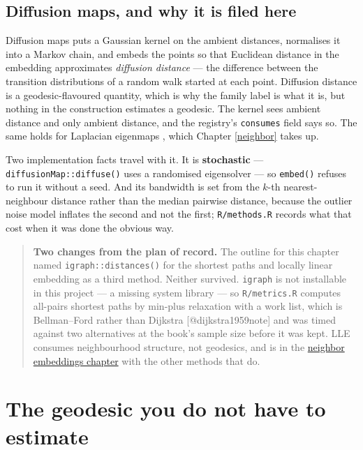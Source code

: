 \documentclass[
  british,
  a4paper,
]{book}
\newenvironment{boxreport}{\begin{quote}}{\end{quote}}
\begin{document}
\subsection{Diffusion maps, and why it is filed here}\label{diffusion-maps-and-why-it-is-filed-here}

Diffusion maps \citep{coifman2006diffusion} puts a Gaussian kernel on the ambient
distances, normalises it into a Markov chain, and embeds the points so that
Euclidean distance in the embedding approximates \emph{diffusion distance} --- the
difference between the transition distributions of a random walk started at each
point. Diffusion distance is a geodesic-flavoured quantity, which is why the
family label is what it is, but nothing in the construction estimates a geodesic.
The kernel sees ambient distance and only ambient distance, and the registry's
\texttt{consumes} field says so. The same holds for Laplacian eigenmaps
\citep{belkin2003laplacian}, which Chapter \ref{neighbor} takes up.

Two implementation facts travel with it. It is \textbf{stochastic} ---
\texttt{diffusionMap::diffuse()} uses a randomised eigensolver --- so \texttt{embed()} refuses to
run it without a seed. And its bandwidth is set from the \(k\)-th
nearest-neighbour distance rather than the median pairwise distance, because the
outlier noise model inflates the second and not the first; \texttt{R/methods.R} records
what that cost when it was done the obvious way.

\begin{boxreport}
\textbf{Two changes from the plan of record.} The outline for this
chapter named \texttt{igraph::distances()} for the shortest paths and
locally linear embedding as a third method. Neither survived.
\texttt{igraph} is not installable in this project --- a missing system
library --- so \texttt{R/metrics.R} computes all-pairs shortest paths by
min-plus relaxation with a work list, which is Bellman--Ford rather than
Dijkstra {[}@dijkstra1959note{]} and was timed against two alternatives
at the book's sample size before it was kept. LLE consumes neighbourhood
structure, not geodesics, and is in the \hyperref[neighbor]{neighbor
embeddings chapter} with the other methods that do.
\end{boxreport}

\section{The geodesic you do not have to estimate}\label{geo-core}
\end{document}

